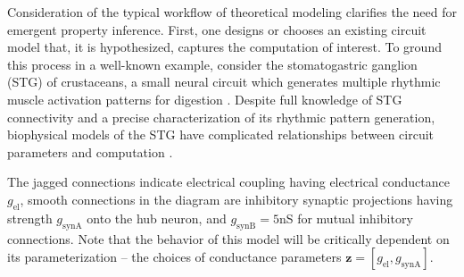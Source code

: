 \documentclass[11pt]{article}
\begin{document}
Consideration of the typical workflow of theoretical modeling clarifies the need for emergent property inference.  
First, one designs or chooses an existing circuit model that, it is hypothesized, captures the computation of interest. 
To ground this process in a well-known example, consider the stomatogastric ganglion (STG) of crustaceans, a small neural circuit which generates multiple rhythmic muscle activation patterns for digestion \cite{marder2002cellular}.
Despite full knowledge of STG connectivity and a precise characterization of its rhythmic pattern generation, biophysical models of the STG have complicated relationships between circuit parameters and computation \cite{goldman2001global, prinz2004similar}.

The jagged connections indicate electrical coupling having electrical conductance $g_{\text{el}}$, smooth connections in the diagram are inhibitory synaptic projections having strength $g_{\text{synA}}$ onto the hub neuron, and $g_{\text{synB}}=5$nS for mutual inhibitory connections.
Note that the behavior of this model will be critically dependent on its parameterization -- the choices of conductance parameters $\mathbf{z} = [g_{\text{el}}, g_{\text{synA}}]$.
\end{document}

